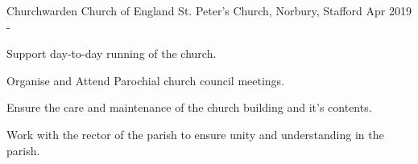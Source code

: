 

\begin{cventries}

	\cventry
	{Churchwarden} %
	{Church of England} %
	{St. Peter's Church, Norbury, Stafford} %
	{Apr 2019 -} %
	{
		\begin{cvitems} %
		\item {Support day-to-day running of the church.}
		\item {Organise and Attend Parochial church council meetings.}
		\item {Ensure the care and maintenance of the church building and it's contents.}
		\item {Work with the rector of the parish to ensure unity and understanding in the parish.}
		\end{cvitems}
	}
\end{cventries}
